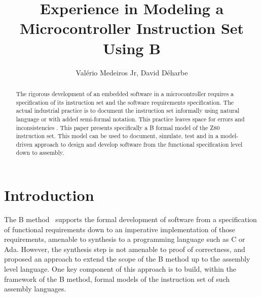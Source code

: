 \documentclass[a4paper]{llncs}
\begin{document}
\title{Experience in Modeling a Microcontroller Instruction Set Using B}
%
%
%
%
\author{Val\'{e}rio Medeiros Jr, David D\'{e}harbe}



\maketitle


\begin{abstract}


The rigorous development of an embedded software in a microcontroller requires a
specification of its instruction set and the software requirements specification.
The actual industrial practice is to document the instruction set informally
using natural language or with added semi-formal notation. This practice leaves
space for errors and inconsistencies \cite{springerlink:Yuan2011}. This paper
presents specifically a B formal model of the Z80 instruction set. This model 
can be  used to document, simulate, test and in a model-driven approach to
design and develop software from the functional specification level down to
assembly.
\end{abstract}


%

\section{Introduction}

The B method~\cite{Abrial} supports the formal development of software
from a specification of functional requirements down to an imperative
implementation of those requirements, amenable to synthesis to a
programming language such as C or Ada. However, the synthesis step is
not amenable to proof of correctness, and~\cite{Dantas_SBMF08} proposed
an approach to extend the scope of the B method up to the assembly
level language. One key component of this approach is to build, within
the framework of the B method, formal models of the instruction set of
such assembly languages.
\end{document}
